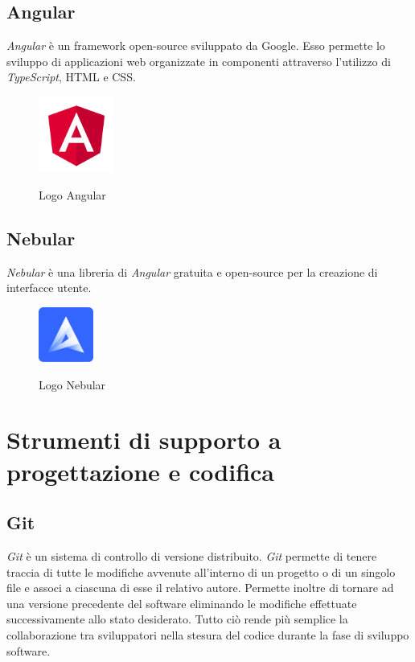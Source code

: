 	\subsection{Angular}
	\emph{Angular} è un \gls{framework} open-source sviluppato da Google. Esso permette lo sviluppo di applicazioni web organizzate in componenti attraverso l'utilizzo di \emph{TypeScript}, \gls{HTML} e \gls{CSS}.
	
	\begin{figure}[H]
		\centering
		\includegraphics[width=2.5cm]{immagini/angular.png} \\
		\caption{\label{fig:logo_angular} Logo Angular}
	\end{figure}

	\subsection{Nebular}
	\emph{Nebular} è una libreria di \emph{Angular} gratuita e open-source per la creazione di interfacce utente.
	
	\begin{figure}[H]
		\centering
		\includegraphics[width=1.8cm]{immagini/nebular.png} \\
		\caption{\label{fig:logo_nebular} Logo Nebular}
	\end{figure}


\section{Strumenti di supporto a progettazione e codifica}
	\subsection{Git}
	\emph{Git} è un sistema di \gls{controllo di versione} distribuito. \emph{Git} permette di tenere traccia di tutte le modifiche avvenute all'interno di un progetto o di un singolo file e associ a ciascuna di esse il relativo autore. Permette inoltre di tornare ad una versione precedente del software eliminando le modifiche effettuate successivamente allo stato desiderato. Tutto ciò rende più semplice la collaborazione tra sviluppatori nella stesura del codice durante la fase di sviluppo software.
	
